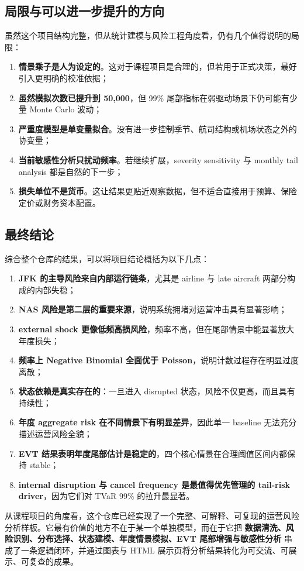 \subsection{局限与可以进一步提升的方向}

虽然这个项目结构完整，但从统计建模与风险工程角度看，仍有几个值得说明的局限：
\begin{enumerate}[leftmargin=2.2em]
  \item \textbf{情景乘子是人为设定的}。这对于课程项目是合理的，但若用于正式决策，最好引入更明确的校准依据；
  \item \textbf{虽然模拟次数已提升到 50{,}000}，但 99\% 尾部指标在弱驱动场景下仍可能有少量 Monte Carlo 波动；
  \item \textbf{严重度模型是单变量拟合}。没有进一步控制季节、航司结构或机场状态之外的协变量；
  \item \textbf{当前敏感性分析只扰动频率}。若继续扩展，severity sensitivity 与 monthly tail analysis 都是自然的下一步；
  \item \textbf{损失单位不是货币}。这让结果更贴近观察数据，但不适合直接用于预算、保险定价或财务资本配置。
\end{enumerate}

\subsection{最终结论}

综合整个仓库的结果，可以将项目结论概括为以下几点：
\begin{enumerate}[leftmargin=2.2em]
  \item \textbf{JFK 的主导风险来自内部运行链条}，尤其是 airline 与 late aircraft 两部分构成的内部失稳；
  \item \textbf{NAS 风险是第二层的重要来源}，说明系统拥堵对运营冲击具有显著影响；
  \item \textbf{external shock 更像低频高损风险}，频率不高，但在尾部情景中能显著放大年度损失；
  \item \textbf{频率上 Negative Binomial 全面优于 Poisson}，说明计数过程存在明显过度离散；
  \item \textbf{状态依赖是真实存在的}：一旦进入 disrupted 状态，风险不仅更高，而且具有持续性；
  \item \textbf{年度 aggregate risk 在不同情景下有明显差异}，因此单一 baseline 无法充分描述运营风险全貌；
  \item \textbf{EVT 结果表明年度尾部估计是稳定的}，四个核心情景在合理阈值区间内都保持 stable；
  \item \textbf{internal disruption 与 cancel frequency 是最值得优先管理的 tail-risk driver}，因为它们对 TVaR 99\% 的拉升最显著。
\end{enumerate}

从课程项目的角度看，这个仓库已经实现了一个完整、可解释、可复现的运营风险分析样板。它最有价值的地方不在于某一个单独模型，而在于它把 \textbf{数据清洗、风险识别、分布选择、状态建模、年度情景模拟、EVT 尾部增强与敏感性分析} 串成了一条逻辑闭环，并通过图表与 HTML 展示页将分析结果转化为可交流、可展示、可复查的成果。
